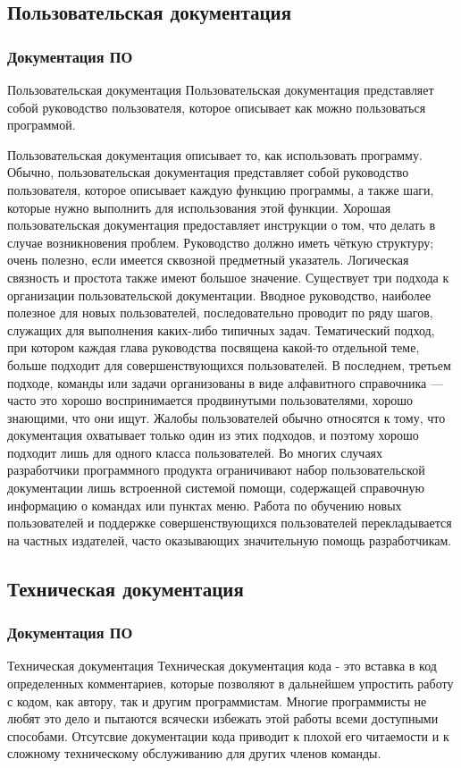 \documentclass{industrial-development}
\begin{document}
\subsection{Пользовательская документация}
\begin{frame} \frametitle{Документация ПО}
  \begin{block}{Пользовательская документация}
Пользовательская документация представляет собой руководство пользователя, которое описывает как можно пользоваться программой.
  \end{block}
\end{frame}

\lecturenotes
Пользовательская документация описывает то, как использовать программу.
Обычно, пользовательская документация представляет собой руководство пользователя, которое описывает каждую функцию программы, а также шаги, которые нужно выполнить для использования этой функции. Хорошая пользовательская документация предоставляет инструкции о том, что делать в случае возникновения проблем. Руководство должно иметь чёткую структуру; очень полезно, если имеется сквозной предметный указатель. Логическая связность и простота также имеют большое значение.
Существует три подхода к организации пользовательской документации. Вводное руководство, наиболее полезное для новых пользователей, последовательно проводит по ряду шагов, служащих для выполнения каких-либо типичных задач. Тематический подход, при котором каждая глава руководства посвящена какой-то отдельной теме, больше подходит для совершенствующихся пользователей. В последнем, третьем подходе, команды или задачи организованы в виде алфавитного справочника — часто это хорошо воспринимается продвинутыми пользователями, хорошо знающими, что они ищут. Жалобы пользователей обычно относятся к тому, что документация охватывает только один из этих подходов, и поэтому хорошо подходит лишь для одного класса пользователей.
Во многих случаях разработчики программного продукта ограничивают набор пользовательской документации лишь встроенной системой помощи, содержащей справочную информацию о командах или пунктах меню. Работа по обучению новых пользователей и поддержке совершенствующихся пользователей перекладывается на частных издателей, часто оказывающих значительную помощь разработчикам. 

\subsection{Техническая документация}
\begin{frame} \frametitle{Документация ПО}
  \begin{block}{Техническая документация}
Техническая документация кода - это вставка в код определенных комментариев, которые позволяют в дальнейшем упростить работу с кодом, как автору, так и другим программистам. Многие программисты не любят это дело и пытаются всячески избежать этой работы всеми доступными способами. Отсутсвие документации кода приводит к плохой его читаемости и к сложному техническому обслуживанию для других членов команды.
  \end{block}
\end{frame}
\end{document}
